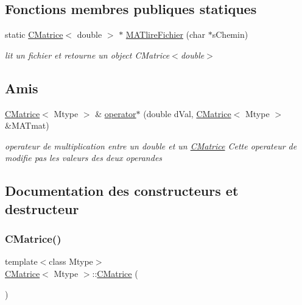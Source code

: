 \subsection*{Fonctions membres publiques statiques}
\begin{DoxyCompactItemize}
\item 
static \hyperlink{classCMatrice}{C\+Matrice}$<$ double $>$ $\ast$ \hyperlink{classCMatrice_a690dad053281a665cba4c7d75215e803}{M\+A\+Tlire\+Fichier} (char $\ast$s\+Chemin)
\begin{DoxyCompactList}\small\item\em lit un fichier et retourne un object C\+Matrice$<$double$>$ \end{DoxyCompactList}\end{DoxyCompactItemize}
\subsection*{Amis}
\begin{DoxyCompactItemize}
\item 
\hyperlink{classCMatrice}{C\+Matrice}$<$ Mtype $>$ \& \hyperlink{classCMatrice_a33685213ef22f3fd4cb0d783a2c555c3}{operator$\ast$} (double d\+Val, \hyperlink{classCMatrice}{C\+Matrice}$<$ Mtype $>$ \&M\+A\+Tmat)
\begin{DoxyCompactList}\small\item\em operateur de multiplication entre un double et un \hyperlink{classCMatrice}{C\+Matrice} Cette operateur de modifie pas les valeurs des deux operandes \end{DoxyCompactList}\end{DoxyCompactItemize}


\subsection{Documentation des constructeurs et destructeur}
\mbox{\label{classCMatrice_a5d0995a09020ec499057c486f505fb2b}} 
\subsubsection{\texorpdfstring{C\+Matrice()}{CMatrice()}\hspace{0.1cm}{\footnotesize\ttfamily [1/3]}}
{\footnotesize\ttfamily template$<$class Mtype$>$ \\
\hyperlink{classCMatrice}{C\+Matrice}$<$ Mtype $>$\+::\hyperlink{classCMatrice}{C\+Matrice} (\begin{DoxyParamCaption}{ }\end{DoxyParamCaption})\hspace{0.3cm}{\ttfamily [inline]}}



